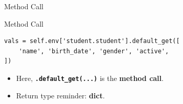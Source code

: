 \begin{frame}[fragile]{Method Call}
\begin{block}{Method Call}
\begin{lstlisting}
vals = self.env['student.student'].default_get([
	'name', 'birth_date', 'gender', 'active',
])
\end{lstlisting}
	\begin{itemize}
		\item Here, \textbf{\texttt{.default\_get(...)}} is the \textbf{method call}.
		\item Return type reminder: \textbf{dict}.
	\end{itemize}
\end{block}
\end{frame}
